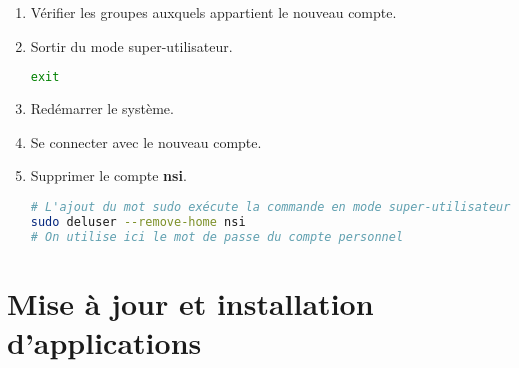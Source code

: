 \documentclass[a4paper,11pt]{article}
\begin{document}
\begin{activite}
\begin{enumerate}
        \item Vérifier les groupes auxquels appartient le nouveau compte.
        \item Sortir du mode super-utilisateur.
        \begin{lstlisting}[language=bash]
exit
            \end{lstlisting}
        \item Redémarrer le système.
        \item Se connecter avec le nouveau compte.
        \item Supprimer le compte \textbf{nsi}.
        \begin{lstlisting}[language=bash]
# L'ajout du mot sudo exécute la commande en mode super-utilisateur.
sudo deluser --remove-home nsi
# On utilise ici le mot de passe du compte personnel
            \end{lstlisting}
        
    \end{enumerate}
\end{activite}
\section{Mise à jour et installation d'applications}
\end{document}

